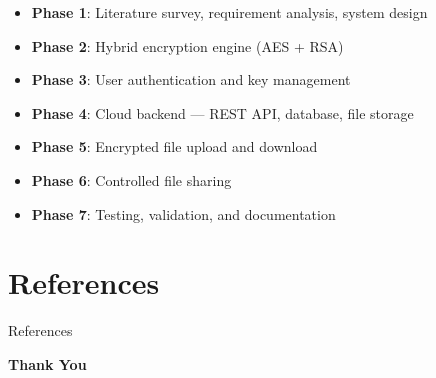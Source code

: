 \documentclass{SKP-beamer}
\begin{document}
\begin{frame}{}
\begin{itemize}
  \item \textbf{Phase 1}: Literature survey, requirement analysis, system design
  \item \textbf{Phase 2}: Hybrid encryption engine (AES + RSA)
  \item \textbf{Phase 3}: User authentication and key management
  \item \textbf{Phase 4}: Cloud backend --- REST API, database, file storage
  \item \textbf{Phase 5}: Encrypted file upload and download
  \item \textbf{Phase 6}: Controlled file sharing
  \item \textbf{Phase 7}: Testing, validation, and documentation
\end{itemize}
\end{frame}

\section{References}
\begin{frame}{References}
    \nocite{*}
	
	
\end{frame}

\begin{frame}{}
\begin{center}
\vspace{2cm}
{\Huge \textbf{Thank You}}
\end{center}
\end{frame}
\end{document}

